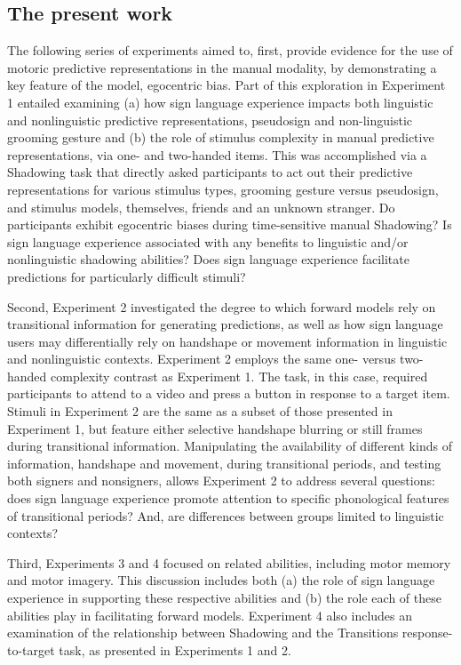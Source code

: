     \subsection{The present work}
            The following series of experiments aimed to, first, provide evidence for the use of motoric predictive representations in the manual modality, by demonstrating a key feature of the  model, egocentric bias. Part of this exploration in Experiment 1 entailed examining (a) how sign language experience impacts both linguistic and nonlinguistic predictive representations, pseudosign and non-linguistic grooming gesture and (b) the role of stimulus complexity in manual predictive representations, via one- and two-handed items. This was accomplished via a Shadowing task that directly asked participants to act out their predictive representations for various stimulus types, grooming gesture versus pseudosign, and stimulus models, themselves, friends and an unknown stranger. Do participants exhibit egocentric biases during time-sensitive manual Shadowing? Is sign language experience associated with any benefits to linguistic and/or nonlinguistic shadowing abilities? Does sign language experience facilitate predictions for particularly difficult stimuli? \par
            Second, Experiment 2 investigated the degree to which forward models rely on transitional information for generating predictions, as well as how sign language users may differentially rely on handshape or movement information in linguistic and nonlinguistic contexts. Experiment 2 employs the same one- versus two-handed complexity contrast as Experiment 1. The task, in this case, required participants to attend to a video and press a button in response to a target item. Stimuli in Experiment 2 are the same as a subset of those presented in Experiment 1, but feature either selective handshape blurring or still frames during transitional information. Manipulating the availability of different kinds of information, handshape and movement, during transitional periods, and testing both signers and nonsigners, allows Experiment 2 to address several questions: does sign language experience promote attention to specific phonological features of transitional periods? And, are differences between groups limited to linguistic contexts? \par
            Third, Experiments 3 and 4 focused on related abilities, including motor memory and motor imagery. This discussion includes both (a) the role of sign language experience in supporting these respective abilities and (b) the role each of these abilities play in facilitating forward models. Experiment 4 also includes an examination of the relationship between Shadowing and the Transitions response-to-target task, as presented in Experiments 1 and 2. \par
